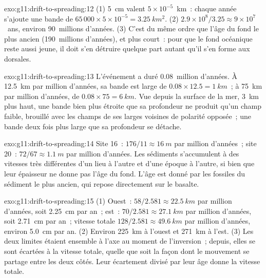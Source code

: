 \begin{solution}{exo:g11:drift-to-spreading:12}
(1) \qty{5}{cm} valent $5 \times 10^{-5}$~\unit{km}~: chaque année
s'ajoute une bande de
$65\,000 \times 5 \times 10^{-5} = \qty{3.25}{km^2}$.
(2) $2.9 \times 10^8/3.25 \approx 9 \times 10^7$~ans, environ 90~millions
d'années. (3) C'est du même ordre que l'âge du fond le plus ancien
(190~millions d'années), et plus court~: pour que le fond océanique reste
aussi jeune, il doit s'en détruire quelque part autant qu'il s'en forme aux
dorsales.
\end{solution}

\begin{solution}{exo:g11:drift-to-spreading:13}
L'événement a duré \num{0.08}~million d'années. À \qty{12.5}{km} par
million d'années, sa bande est large de $0.08 \times 12.5 = \qty{1}{km}$~; à
\qty{75}{km} par million d'années, de $0.08 \times 75 = \qty{6}{km}$. Vue
depuis la surface de la mer, \qty{3}{km} plus haut, une bande bien plus
étroite que sa profondeur ne produit qu'un champ faible, brouillé avec les
champs de ses larges voisines de polarité opposée~; une bande deux fois
plus large que sa profondeur se détache.
\end{solution}

\begin{solution}{exo:g11:drift-to-spreading:14}
Site 16~: $176/11 \approx \qty{16}{m}$ par million d'années~; site 20~:
$72/67
\approx \qty{1.1}{m}$ par million d'années. Les sédiments s'accumulent à des
vitesses très différentes d'un lieu à l'autre et d'une époque à l'autre, si
bien que leur épaisseur ne donne pas l'âge du fond. L'âge est donné par les
fossiles du sédiment le plus ancien, qui repose directement sur le basalte.
\end{solution}

\begin{solution}{exo:g11:drift-to-spreading:15}
(1) Ouest~: $58/2.581 \approx \qty{22.5}{km}$ par million d'années, soit
\qty{2.25}{cm} par an~; est~: $70/2.581 \approx \qty{27.1}{km}$ par million
d'années, soit \qty{2.71}{cm} par an~; vitesse totale $128/2.581 \approx \qty{49.6}{km}$ par
million d'années, environ \qty{5.0}{cm} par an. (2) Environ \qty{225}{km} à
l'ouest et \qty{271}{km} à l'est. (3) Les deux limites étaient ensemble à
l'axe au moment de l'inversion~; depuis, elles se sont écartées à la vitesse
totale, quelle que soit la façon dont le mouvement se partage entre les deux
côtés. Leur écartement divisé par leur âge donne la vitesse totale.
\end{solution}

